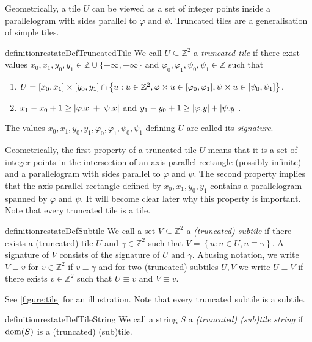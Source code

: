\documentclass[twoside,leqno]{article}
\let\Cref\cref
\newcommand{\Z}{\mathbb{Z}}
\renewcommand{\phi}{\varphi}
\newcommand{\set}[1]{\left\lbrace #1 \right\rbrace}
\newcommand{\absolute}[1]{\left\lvert#1\right\rvert}
\begin{document}
Geometrically, a tile $U$ can be viewed as a set of integer points inside a parallelogram with sides parallel to $\phi$ and $\psi$. Truncated tiles are a generalisation of simple tiles. 

\begin{restatable*}{definition}{restateDefTruncatedTile}
We call $U \subseteq \Z^2$ a \emph{truncated tile} if there exist values $x_0, x_1, y_0, y_1 \in \Z \cup \{-\infty, +\infty\}$ and $\phi_0, \phi_1, \psi_0, \psi_1 \in \Z$ such that 
	\begin{enumerate}
		\item $U = [x_0, x_1] \times [y_0, y_1] \cap \set{u : u \in \Z^2, \h{u} \in [\phi_0, \phi_1], \s{u} \in [\psi_0, \psi_1]}$. 
		\item $x_1 - x_0 + 1 \ge \absolute{\x{\phi}} + \absolute{\x{\psi}}$ and $y_1 - y_0 + 1 \ge \absolute{\y{\phi}} + \absolute{\y{\psi}}$. 
	\end{enumerate}
The values $x_0, x_1, y_0, y_1, \phi_0, \phi_1, \psi_0, \psi_1$ defining $U$ are called its \emph{signature}. 
\end{restatable*}

Geometrically, the first property of a truncated tile $U$ means that it is a set of integer points in the intersection of an axis-parallel rectangle (possibly infinite) and a parallelogram with sides parallel to $\phi$ and $\psi$. The second property implies that the axis-parallel rectangle defined by $x_0, x_1, y_0, y_1$ contains a parallelogram spanned by $\phi$ and $\psi$. It will become clear later why this property is important. Note that every truncated tile is a tile.

\begin{restatable*}[Subtile]{definition}{restateDefSubtile}\label{subtile_definition}
We call a set $V \subseteq \Z^2$ a \emph{(truncated) subtile} if there exists a (truncated) tile $U$ and $\gamma \in \Z^2$ such that $V = \set{u : u \in U, u \equiv \gamma}$. A signature of $V$ consists of the signature of $U$ and $\gamma$. Abusing notation, we write $V \equiv v$ for $v \in \Z^2$ if $v \equiv \gamma$ and for two (truncated) subtiles $U,V$ we write $U \equiv V$ if there exists $v \in \Z^2$ such that $U \equiv v$ and $V \equiv v$.
\end{restatable*}

See \Cref{figure:tile} for an illustration. Note that every truncated subtile is a subtile.

\begin{restatable*}{definition}{restateDefTileString}\label{tile_string_definition}
We call a string $S$ a \emph{(truncated) (sub)tile string} if $\operatorname*{dom}(S)$ is a (truncated) (sub)tile.
\end{restatable*}
\end{document}
